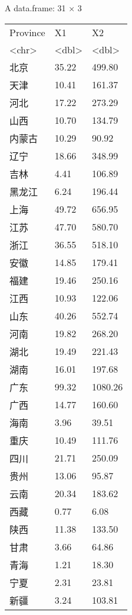 \documentclass[11pt]{article}
\begin{document}
    A data.frame: 31 × 3
\begin{tabular}{lll}
 Province & X1 & X2\\
 <chr> & <dbl> & <dbl>\\
\hline
	 北京       & 35.22 &  499.80\\
	 天津       & 10.41 &  161.37\\
	 河北       & 17.22 &  273.29\\
	 山西       & 10.70 &  134.79\\
	 内蒙古 & 10.29 &   90.92\\
	 辽宁       & 18.66 &  348.99\\
	 吉林       &  4.41 &  106.89\\
	 黑龙江 &  6.24 &  196.44\\
	 上海       & 49.72 &  656.95\\
	 江苏       & 47.70 &  580.70\\
	 浙江       & 36.55 &  518.10\\
	 安徽       & 14.85 &  179.41\\
	 福建       & 19.46 &  250.16\\
	 江西       & 10.93 &  122.06\\
	 山东       & 40.26 &  552.74\\
	 河南       & 19.82 &  268.20\\
	 湖北       & 19.49 &  221.43\\
	 湖南       & 16.01 &  197.68\\
	 广东       & 99.32 & 1080.26\\
	 广西       & 14.77 &  160.60\\
	 海南       &  3.96 &   39.51\\
	 重庆       & 10.49 &  111.76\\
	 四川       & 21.71 &  250.09\\
	 贵州       & 13.06 &   95.87\\
	 云南       & 20.34 &  183.62\\
	 西藏       &  0.77 &    6.08\\
	 陕西       & 11.38 &  133.50\\
	 甘肃       &  3.66 &   64.86\\
	 青海       &  1.21 &   18.30\\
	 宁夏       &  2.31 &   23.81\\
	 新疆       &  3.24 &  103.81\\
\end{tabular}
\end{document}
